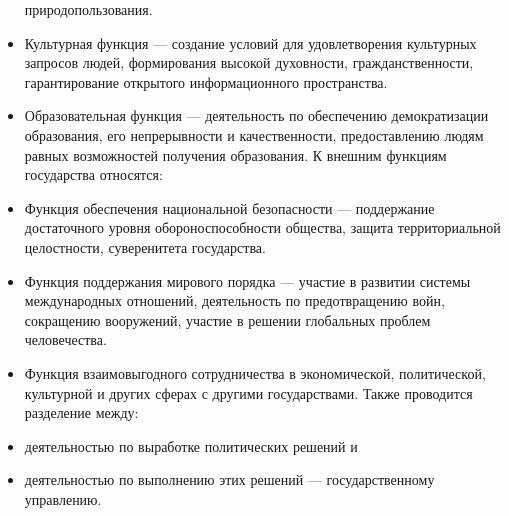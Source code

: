 \documentclass[12pt]{article}
\begin{document}
\begin{itemize}
природопользования.
\item Культурная функция — создание условий для удовлетворения культурных запросов людей, формирования
высокой духовности, гражданственности, гарантирование открытого информационного пространства.
\item Образовательная функция — деятельность по обеспечению демократизации образования, его непрерывности
и качественности, предоставлению людям равных возможностей получения образования.
К внешним функциям государства относятся:
\item Функция обеспечения национальной безопасности — поддержание достаточного уровня обороноспособности
общества, защита территориальной целостности, суверенитета государства.
\item  Функция  поддержания  мирового  порядка  —  участие  в  развитии  системы  международных  отношений,
деятельность по предотвращению войн, сокращению вооружений, участие в решении глобальных проблем
человечества.
\item Функция взаимовыгодного сотрудничества в экономической, политической, культурной и других сферах с
другими государствами.
Также проводится разделение между:
\item деятельностью по выработке политических решений и
\item деятельностью по выполнению этих решений — государственному управлению.
\end{itemize}

\newpage
\end{document}
